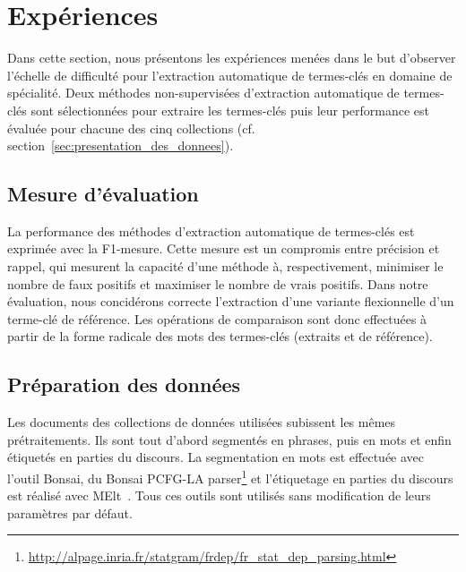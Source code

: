 \section{Expériences}
\label{sec:experiences}
  Dans cette section, nous présentons les expériences menées dans le but
  d'observer l'échelle de difficulté pour l'extraction automatique de
  termes-clés en domaine de spécialité. Deux méthodes non-supervisées
  d'extraction automatique de termes-clés sont sélectionnées pour extraire les
  termes-clés puis leur performance est évaluée pour chacune des cinq
  collections (cf. section~\ref{sec:presentation_des_donnees}).

  \subsection{Mesure d'évaluation}
  \label{subsec:mesure_d_evaluation}
    La performance des méthodes d'extraction automatique de termes-clés est
    exprimée avec la F1-mesure. Cette mesure est un compromis entre précision et
    rappel, qui mesurent la capacité d'une méthode à, respectivement, minimiser
    le nombre de faux positifs et maximiser le nombre de vrais positifs. Dans
    notre évaluation, nous concidérons correcte l'extraction d'une variante
    flexionnelle d'un terme-clé de référence. Les opérations de comparaison sont
    donc effectuées à partir de la forme radicale des mots des termes-clés
    (extraits et de référence).

  \subsection{Préparation des données}
  \label{subsec:preparation_des_donnees}
    Les documents des collections de données utilisées subissent les mêmes
    prétraitements. Ils sont tout d'abord segmentés en phrases, puis en mots et
    enfin étiquetés en parties du discours. La segmentation en mots est
    effectuée avec l'outil Bonsai, du Bonsai PCFG-LA
    parser\footnote{\url{http://alpage.inria.fr/statgram/frdep/fr_stat_dep_parsing.html}}
    et l'étiquetage en parties du discours est réalisé avec
    MElt~\cite{denis2009melt}. Tous ces outils sont utilisés sans modification
    de leurs paramètres par défaut.

